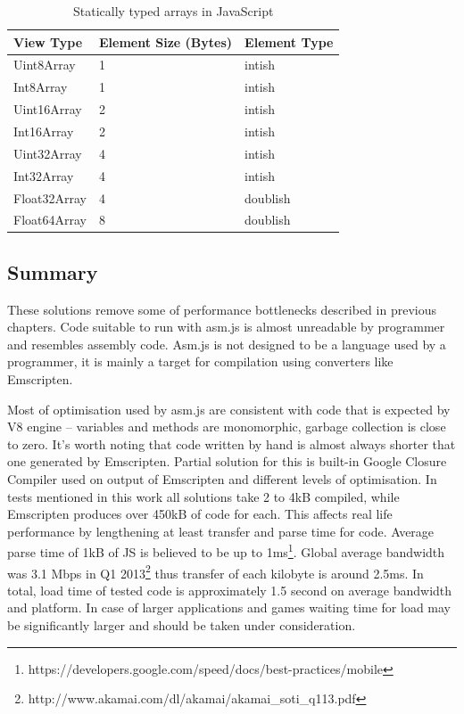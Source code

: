 \begin{table}[h!]
\caption{Statically typed arrays in JavaScript}
\centering
\label{table:jsarrays}
\begin{tabular}{|l|l|l|}
  	\hline
View Type & Element Size (Bytes) & Element Type \\ \hline
Uint8Array & 1 & intish \\ \hline
Int8Array & 1 & intish \\ \hline
Uint16Array & 2 & intish \\ \hline
Int16Array & 2 & intish \\ \hline
Uint32Array & 4 & intish \\ \hline
Int32Array & 4 & intish \\ \hline
Float32Array & 4 & doublish \\ \hline
Float64Array & 8 & doublish \\ \hline
\end{tabular}
\end{table}

\subsection{Summary}
\label{sec:asmjssummary}

These solutions remove some of performance bottlenecks described in previous chapters. Code suitable to run with asm.js is almost unreadable by programmer and resembles assembly code. Asm.js is not designed to be a language used by a programmer, it is mainly a target for compilation using converters like Emscripten. 

Most of optimisation used by asm.js are consistent with code that is expected by V8 engine -- variables and methods are monomorphic, garbage collection is close to zero. It's worth noting that code written by hand is almost always shorter that one generated by Emscripten. Partial solution for this is built-in Google Closure Compiler used on output of Emscripten and different levels of optimisation.
In tests mentioned in this work all solutions take 2 to 4kB compiled, while Emscripten produces over 450kB of code for each. This affects real life performance by lengthening at least transfer and parse time for code. Average parse time of 1kB of JS is believed to be up to 1ms\footnote{https://developers.google.com/speed/docs/best-practices/mobile}. Global average bandwidth was 3.1 Mbps in Q1 2013\footnote{http://www.akamai.com/dl/akamai/akamai\_soti\_q113.pdf} thus transfer of each kilobyte is around 2.5ms. In total, load time of tested code is approximately 1.5 second on average bandwidth and platform. In case of larger applications and games waiting time for load may be significantly larger and should be taken under consideration.

